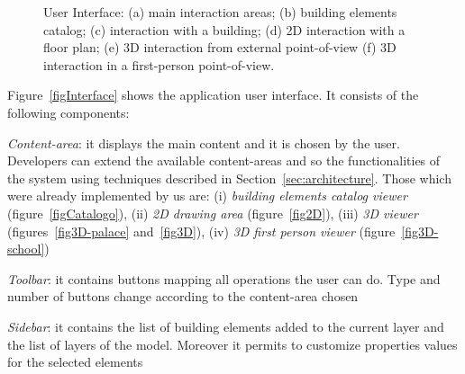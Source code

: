 \begin{figure}[htbp]
   \caption{User Interface: (a) main interaction areas; (b) building elements catalog; (c) interaction with a building; (d) 2D interaction with a floor plan; (e) 3D interaction from external point-of-view (f) 3D interaction in a first-person point-of-view.}
   \label{fig:er}
\end{figure}





Figure~\ref{figInterface} shows the application user interface. It consists of the following components:

\emph{Content-area}: it displays the main content and it is chosen by the user. Developers can extend the available content-areas and so the functionalities of the system using techniques described in Section~\ref{sec:architecture}. Those which were already implemented by us are: (i) \emph{building elements catalog viewer} (figure~\ref{figCatalogo}), (ii) \emph{2D drawing area} (figure~\ref{fig2D}), (iii) \emph{3D viewer} (figures~\ref{fig3D-palace} and~\ref{fig3D}), (iv) \emph{3D first person viewer} (figure~\ref{fig3D-school})

\emph{Toolbar}: it contains buttons mapping all operations the user can do. Type and number of buttons change according to the content-area chosen

\emph{Sidebar}: it contains the list of building elements added to the current layer and the list of layers of the model. Moreover it permits to customize properties values for the selected elements\\






